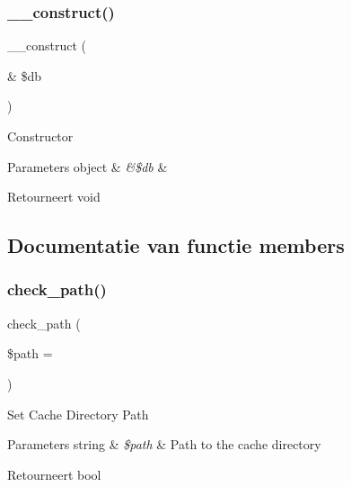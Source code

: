 \subsubsection{\texorpdfstring{\_\_construct()}{\_\_construct()}}
{\footnotesize\ttfamily \+\_\+\+\_\+construct (\begin{DoxyParamCaption}\item[{\&}]{\$db }\end{DoxyParamCaption})}

Constructor


\begin{DoxyParams}[1]{Parameters}
object & {\em \&\$db} & \\
\hline
\end{DoxyParams}
\begin{DoxyReturn}{Retourneert}
void 
\end{DoxyReturn}


\subsection{Documentatie van functie members}
\mbox{\label{class_c_i___d_b___cache_adb73b6f91025d00c565d228c4f611f41}} 
\subsubsection{\texorpdfstring{check\_path()}{check\_path()}}
{\footnotesize\ttfamily check\+\_\+path (\begin{DoxyParamCaption}\item[{}]{\$path = {\ttfamily \textquotesingle{}\textquotesingle{}} }\end{DoxyParamCaption})}

Set Cache Directory Path


\begin{DoxyParams}[1]{Parameters}
string & {\em \$path} & Path to the cache directory \\
\hline
\end{DoxyParams}
\begin{DoxyReturn}{Retourneert}
bool 
\end{DoxyReturn}
\mbox{\label{class_c_i___d_b___cache_ab97f36d9c24db4b2e91c9e02342cc994}} 

